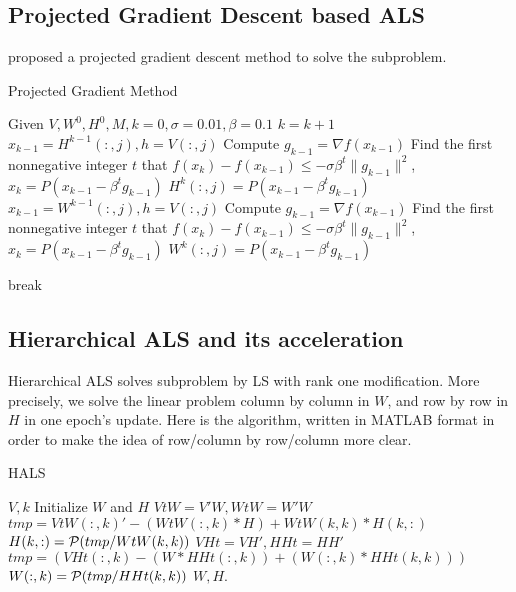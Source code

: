 \documentclass{article}
\begin{document}
\subsection{Projected Gradient Descent based ALS}
\cite{alspgd} proposed a projected gradient descent method to solve the subproblem. 

\begin{algorithm}[htp]
	\caption{Projected Gradient Method}%
	\begin{algorithmic}[1]%
		\STATE Given $V,W^0,H^0,M,k=0,\sigma = 0.01, \beta = 0.1$ 
		\STATE $k = k + 1$
		\STATE $x_{k-1} = H^{k-1}(:,j), h = V(:,j)$
		\STATE Compute $g_{k-1} = \nabla f(x_{k-1})$
		\STATE Find the first nonnegative integer $t$ that $f(x_{k}) - f(x_{k-1})\leq -\sigma \beta^t \|g_{k-1}\|^2$,$x_{k} = P(x_{k-1} - \beta^t g_{k-1})$
		\STATE $H^k(:,j) = P(x_{k-1} - \beta^t g_{k-1})$  
		\ENDFOR
		\STATE $x_{k-1} = W^{k-1}(:,j), h = V(:,j)$
		\STATE Compute $g_{k-1} = \nabla f(x_{k-1})$
		\STATE Find the first nonnegative integer $t$ that $f(x_{k}) - f(x_{k-1})\leq -\sigma \beta^t \|g_{k-1}\|^2$,$x_{k} = P(x_{k-1} - \beta^t g_{k-1})$
		\STATE $W^k(:,j) = P(x_{k-1} - \beta^t g_{k-1})$  
		\ENDFOR		
		
		\STATE break
		\ENDIF
		\ENDWHILE
	\end{algorithmic}
\end{algorithm}


\subsection{Hierarchical ALS and its acceleration}
Hierarchical  ALS \cite{hals} solves subproblem by LS with rank one modification. More precisely, we solve the linear problem column by column in $W$, and row by row in $H$ in one epoch's update. Here is  the algorithm, written in MATLAB format in order to make the idea of row/column by row/column more clear.

\begin{algorithm}[H]
	\caption{HALS}
	\begin{algorithmic}[1]
		\REQUIRE $V, k$
		\STATE Initialize $W$ and $H$ 
		\STATE $VtW = V'W, WtW = W'W$
		\STATE $tmp = VtW(:,k)' - (WtW(:,k) * H) + WtW(k,k)*H(k,:)$
		\STATE $H(k,:) = \P(tmp/WtW(k,k))$
		\ENDFOR
				\STATE $VHt = VH', HHt = HH'$
		\STATE $tmp = (VHt(:,k) - (W * HHt(:,k)) + (W(:,k)* HHt(k,k)))$
		\STATE $W(:,k) = \P(tmp/HHt(k,k))$
		\ENDFOR
		\ENDWHILE
		\STATE \Return $W,H$.
	\end{algorithmic}
\end{algorithm}
\end{document}
